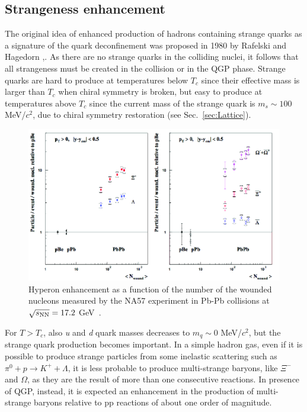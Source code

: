 \subsection{Strangeness enhancement}
\label{subsec:StrangEnhancSPS}
The original idea of enhanced production of hadrons containing strange quarks 
as a signature of the quark deconfinement was proposed in 1980 by Rafelski 
and Hagedorn \cite{PhysRevLett.48.1066},\cite{Muller:2011tu}. As there are no 
strange quarks in the colliding nuclei, it follows that all strangeness must be 
created in the collision or in the QGP phase. Strange quarks are hard to 
produce at temperatures below $T_c$ since their effective mass is larger 
than $T_c$ when chiral symmetry is broken, but easy to produce at temperatures 
above $T_c$ since the current mass of the strange quark is $m_s \sim 100$ MeV/$c^2$, 
due to chiral symmetry restoration (see Sec.~\ref{sec:Lattice}). 
\begin{figure}[!ht]
  \centering
  \includegraphics[width=12cm]{FigCap1/strangEnhancSPS.png}
  \caption{ Hyperon enhancement as a function of the number of the wounded nucleons measured by the NA57 experiment in Pb-Pb collisions at $\sqrt{s_{\rm NN}} = 17.2$ GeV~\cite{Sandor:2004bg}.}
  \label{fig:sEnhancSPS}
\end{figure}
For $T > T_c$, also \textit{u} and \textit{d} quark masses 
decreases to $m_q \sim 0$ MeV/$c^2$, but the 
strange quark production becomes important. In a simple hadron gas, 
even if it is possible to produce strange particles from some inelastic 
scattering such as $\pi^0+p \rightarrow K^++\Lambda$, it is less probable 
to produce multi-strange baryons, like $\Xi ^-$ and $\Omega$, as 
they are the result of more than one consecutive reactions. In presence 
of QGP, instead, it is expected an enhancement in the production of 
multi-strange baryons relative to pp reactions of about one order of magnitude.
